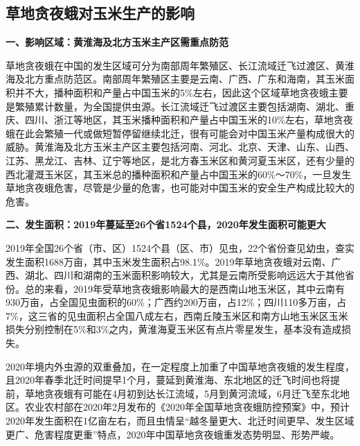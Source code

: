 \documentclass{progbookcn}
\begin{document}
\subsection{草地贪夜蛾对玉米生产的影响}
\textbf{一、影响区域：黄淮海及北方玉米主产区需重点防范}

草地贪夜蛾在中国的发生区域可分为南部周年繁殖区、长江流域迁飞过渡区、黄淮海及北方重点防范区。南部周年繁殖区主要是云南、广西、广东和海南，其玉米面积并不大，播种面积和产量占中国玉米的5\%左右，因此这个区域草地贪夜蛾主要是繁殖累计数量，为全国提供虫源。长江流域迁飞过渡区主要包括湖南、湖北、重庆、四川、浙江等地区，其玉米播种面积和产量占中国玉米的10\%左右，草地贪夜蛾在此会繁殖一代或做短暂停留继续北迁，很有可能会对中国玉米产量构成很大的威胁。黄淮海及北方玉米主产区主要包括河南、河北、北京、天津、山东、山西、江苏、黑龙江、吉林、辽宁等地区，是北方春玉米区和黄河夏玉米区，还有少量的西北灌溉玉米区，其玉米总的播种面积和产量占中国玉米的60\%～70\%，一旦发生草地贪夜蛾危害，尽管是少量的危害，也可能对中国玉米的安全生产构成比较大的危害。

\textbf{二、发生面积：2019年蔓延至26个省1524个县，2020年发生面积可能更大}

2019年全国26个省（市、区）1524个县（区、市）见虫，22个省份查见幼虫，查实发生面积1688万亩，其中玉米发生面积占98.1\%。2019年草地贪夜蛾对云南、广西、湖北、四川和湖南的玉米面积影响较大，尤其是云南所受影响远远大于其他省份。总的来看，2019年受草地贪夜蛾影响最大的是西南山地玉米区，其中云南有930万亩，占全国见虫面积的60\%；广西约200万亩，占12\%；四川110多万亩，占7\%，这三省的见虫面积占全国八成左右，西南丘陵玉米区和南方山地玉米区玉米损失分别控制在5\%和3\%之内，黄淮海夏玉米区有点片零星发生，基本没有造成损失。

2020年境内外虫源的双重叠加，在一定程度上加重了中国草地贪夜蛾的发生程度，且2020年春季北迁时间提早1个月，蔓延到黄淮海、东北地区的迁飞时间也将提前，草地贪夜蛾有可能在4月初到达长江流域，5月到黄河流域，6月迁飞至东北地区。农业农村部在2020年2月发布的《2020年全国草地贪夜蛾防控预案》中，预计2020年发生面积在1亿亩左右，而且虫情呈“越冬量更大、北迁时间更早、发生区域更广、危害程度更重”特点，2020年中国草地贪夜蛾重发态势明显、形势严峻。

\end{document}
